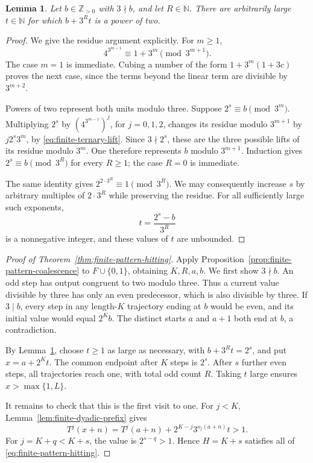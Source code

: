 \documentclass[11pt,a4paper]{article}
\newtheorem{lemma}[theorem]{Lemma}
\begin{document}
\begin{lemma}\label{lem:finite-power-two-residue}
Let $b\in\mathbb Z_{>0}$ with $3\nmid b$, and let $R\in\mathbb N$.
There are arbitrarily large $t\in\mathbb N$ for which
$b+3^Rt$ is a power of two.
\end{lemma}
\begin{proof}
We give the residue argument explicitly. For $m\ge1$,
\begin{equation}\label{eq:finite-ternary-lift}
4^{3^{m-1}}\equiv1+3^m\pmod{3^{m+1}}.
\end{equation}
The case $m=1$ is immediate. Cubing a number of the form
$1+3^m(1+3c)$ proves the next case, since the terms beyond the
linear term are divisible by $3^{m+2}$.

Powers of two represent both units modulo three. Suppose
$2^s\equiv b\pmod{3^m}$. Multiplying $2^s$ by
$(4^{3^{m-1}})^j$, for $j=0,1,2$, changes its residue modulo
$3^{m+1}$ by $j2^s3^m$, by \eqref{eq:finite-ternary-lift}.
Since $3\nmid2^s$, these are the three possible lifts of its
residue modulo $3^m$. One therefore represents $b$ modulo
$3^{m+1}$. Induction gives $2^s\equiv b\pmod{3^R}$
for every $R\ge1$; the case $R=0$ is immediate.

The same identity gives
$2^{2\cdot3^R}\equiv1\pmod{3^R}$.
We may consequently increase $s$ by arbitrary multiples of
$2\cdot3^R$ while preserving the residue. For all sufficiently
large such exponents,
\[
t=\frac{2^s-b}{3^R}
\]
is a nonnegative integer, and these values of $t$ are unbounded.
\end{proof}

\begin{proof}[Proof of Theorem~\ref{thm:finite-pattern-hitting}]
Apply Proposition~\ref{prop:finite-pattern-coalescence} to
$F\cup\{0,1\}$, obtaining $K,R,a,b$.
We first show $3\nmid b$. An odd step has output congruent
to two modulo three. Thus a current value divisible by three has
only an even predecessor, which is also divisible by three.
If $3\mid b$, every step in any length-$K$ trajectory ending
at $b$ would be even, and its initial value would equal $2^Kb$.
The distinct starts $a$ and $a+1$ both end at $b$, a
contradiction.

By Lemma~\ref{lem:finite-power-two-residue}, choose $t\ge1$
as large as necessary, with $b+3^Rt=2^s$, and put
$x=a+2^Kt$. The common endpoint after $K$ steps is $2^s$.
After $s$ further even steps, all trajectories reach one, with
total odd count $R$. Taking $t$ large ensures
$x>\max\{1,L\}$.

It remains to check that this is the first visit to one.
For $j<K$, Lemma~\ref{lem:finite-dyadic-prefix} gives
\[
T^j(x+n)=T^j(a+n)+2^{K-j}3^{o_j(a+n)}t>1.
\]
For $j=K+q<K+s$, the value is $2^{s-q}>1$.
Hence $H=K+s$ satisfies all of
\eqref{eq:finite-pattern-hitting}.
\end{proof}
\end{document}
